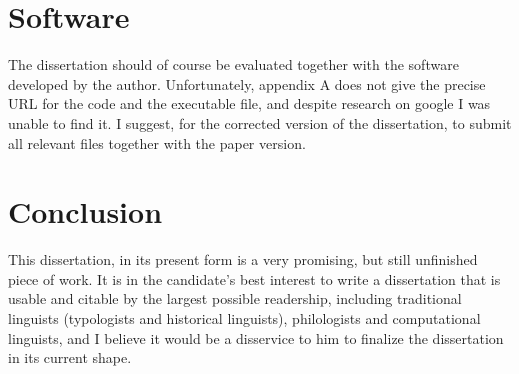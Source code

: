 \documentclass[oneside,a4paper,11pt]{article}
\begin{document}
\section{Software}
The dissertation should of course be evaluated together with the software developed by the author. Unfortunately, appendix A does not give the precise URL for the code and the executable file, and despite research on google I was unable to find it. I suggest, for the corrected version of the dissertation, to submit all relevant files together with the paper version.

\section*{Conclusion}
This dissertation, in its present form is a very promising, but still unfinished piece of work. It is in the candidate's best interest to write a dissertation that is usable and citable by the largest possible readership, including traditional linguists (typologists and historical linguists), philologists and computational linguists, and I believe it would be a disservice to him to finalize the dissertation in its current shape.



\end{document}
